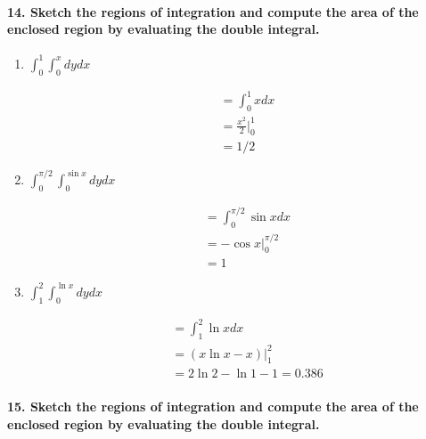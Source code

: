 \documentclass{article}
\begin{document}
\paragraph{14. Sketch the regions of integration and compute the area of the enclosed region by evaluating the double integral.} 
\begin{enumerate}
\item $ \int_0^1 \int_0^x dy dx $

\begin{align*}
    &= \int_{0}^{1}xdx \\
    &= \frac{x^2}{2}\Bigr|_{0}^{1} \\
    &= 1/2
\end{align*}

\item $ \int_0^{\pi/2} \int_0^{\sin x} dy dx $

\begin{align*}
    &= \int_{0}^{\pi/2}\sin xdx \\
    &= -\cos x\Bigr|_{0}^{\pi/2} \\
    &= 1
\end{align*}

\item $ \int_1^2 \int_0^{\ln x} dy dx $

\begin{align*}
    &= \int_{1}^{2}\ln xdx \\
    &= (x\ln x - x)\Bigr|_{1}^{2} \\
    &= 2 \ln2-\ln1-1 = 0.386
\end{align*}

\end{enumerate}

\paragraph{15. Sketch the regions of integration and compute the area of the enclosed region by evaluating the double integral.} 
\end{document}
